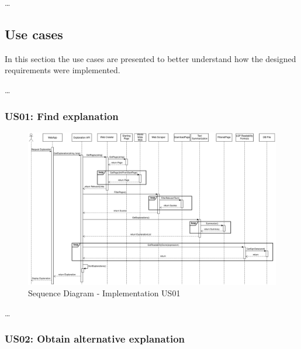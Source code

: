\dots

\subsection{Use cases}

In this section the use cases are presented to better understand how the designed requirements were implemented.

\dots %

\subsubsection{US01: Find explanation}

\begin{figure}[H]
\centering
\includegraphics[width=\textwidth,keepaspectratio]{ch5/assets/US01_SD_Implement.png}
\caption[Sequence Diagram Implementation US01]{Sequence Diagram - Implementation US01}
\label{fig:uc01Imp}
\end{figure}

\dots %

\subsubsection{US02: Obtain alternative explanation}

